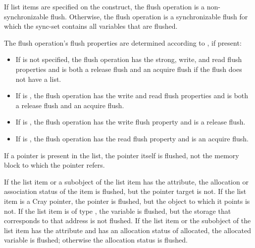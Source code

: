 If list items are specified on the  construct, the flush operation
is a non-synchronizable flush.  Otherwise, the flush operation is a
synchronizable flush for which the sync-set contains all variables that are
flushed.

The flush operation's flush properties are determined according to
, if present:

\begin{itemize}
\item If  is not specified, the flush operation has the
strong, write, and read flush properties and is both a release flush and an
acquire flush if the flush does not have a list.

\item If  is , the flush operation has the
write and read flush properties and is both a release flush and an acquire flush.

\item If  is , the flush operation has
the write flush property and is a release flush.

\item If  is , the flush operation has
the read flush property and is an acquire flush.
\end{itemize}


\begin{ccppspecific}
If a pointer is present in the list, the pointer itself is flushed, not the memory block to 
which the pointer refers.
\end{ccppspecific}

\begin{fortranspecific}
If the list item or a subobject of the list item has the  attribute, the allocation 
or association status of the  item is flushed, but the pointer target is not. If the 
list item is a Cray pointer, the pointer is flushed, but the object to which it points is not. 
If the list item is of type , the variable is flushed, but the storage that corresponds 
to that address is not flushed. If the list item or the subobject of the list item has the 
 attribute and has an allocation status of allocated, the
allocated variable is flushed; otherwise the allocation status is flushed.
\end{fortranspecific}

